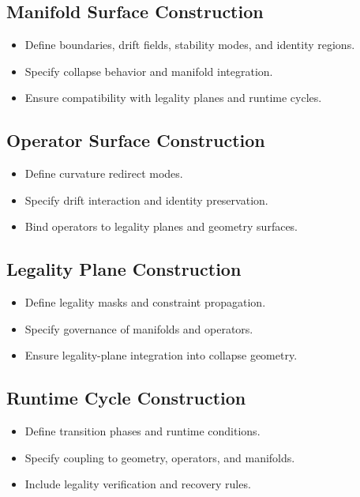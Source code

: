 \subsection{Manifold Surface Construction}
\begin{itemize}
    \item Define boundaries, drift fields, stability modes, and identity regions.
    \item Specify collapse behavior and manifold integration.
    \item Ensure compatibility with legality planes and runtime cycles.
\end{itemize}

\subsection{Operator Surface Construction}
\begin{itemize}
    \item Define curvature redirect modes.
    \item Specify drift interaction and identity preservation.
    \item Bind operators to legality planes and geometry surfaces.
\end{itemize}

\subsection{Legality Plane Construction}
\begin{itemize}
    \item Define legality masks and constraint propagation.
    \item Specify governance of manifolds and operators.
    \item Ensure legality-plane integration into collapse geometry.
\end{itemize}

\subsection{Runtime Cycle Construction}
\begin{itemize}
    \item Define transition phases and runtime conditions.
    \item Specify coupling to geometry, operators, and manifolds.
    \item Include legality verification and recovery rules.
\end{itemize}

